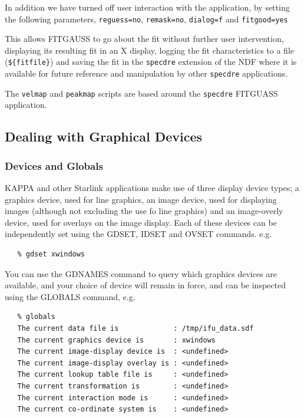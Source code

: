 \documentclass[twoside,11pt]{article}
\newcommand{\xref}[3]{#1}
\newcommand{\xlabel}[1]{}
\begin{document}
In addition we have turned off user interaction with the application, by setting the following parameters, \verb+reguess=no+, \verb+remask=no+, \verb+dialog=f+ and \verb+fitgood=yes+

This allows FITGAUSS to go about the fit without further user intervention, displaying its resulting fit in an X display, logging the fit characteristics to a file (\verb+${fitfile}+) and saving the fit in the \xref{{\tt specdre} extension}{sun86}{extension} of the NDF where it is available for future reference and manipulation by other {\tt specdre} applications.

The \xref{{\tt velmap}}{sun237}{velmap} and \xref{{\tt peakmap}}{sun237}{peakmap} scripts are based around the {\tt specdre} FITGUASS application.

\subsection{\label{sc16_graphics}Dealing with Graphical Devices\xlabel{sc16_graphics}}

\subsubsection{Devices and Globals}

\xref{KAPPA}{sun95}{} and other Starlink applications make use of three display device types; a \xref{graphics device}{sun95}{se_graphdev}, used for line graphics, an image device, used for displaying images (although not excluding the use fo line graphics) and an image-overly device, used for overlays on the image display. Each of these devices can be independently set using the \xref{GDSET}{sun95}{GDSET}, \xref{IDSET}{sun95}{IDSET} and \xref{OVSET}{sun95}{OVSET} commands. e.g.\

\small\begin{verbatim}
   % gdset xwindows
\end{verbatim}\normalsize

You can use the \xref{GDNAMES}{sun95}{GDNAMES} command to query which graphics devices are available, and your choice of device will remain in force, and can be inspected using the \xref{GLOBALS}{sun95}{GLOBALS} command, e.g.\

\small\begin{verbatim}
   % globals
   The current data file is             : /tmp/ifu_data.sdf
   The current graphics device is       : xwindows
   The current image-display device is  : <undefined>
   The current image-display overlay is : <undefined>
   The current lookup table file is     : <undefined>
   The current transformation is        : <undefined>
   The current interaction mode is      : <undefined>
   The current co-ordinate system is    : <undefined>
\end{verbatim}\normalsize
\end{document}
